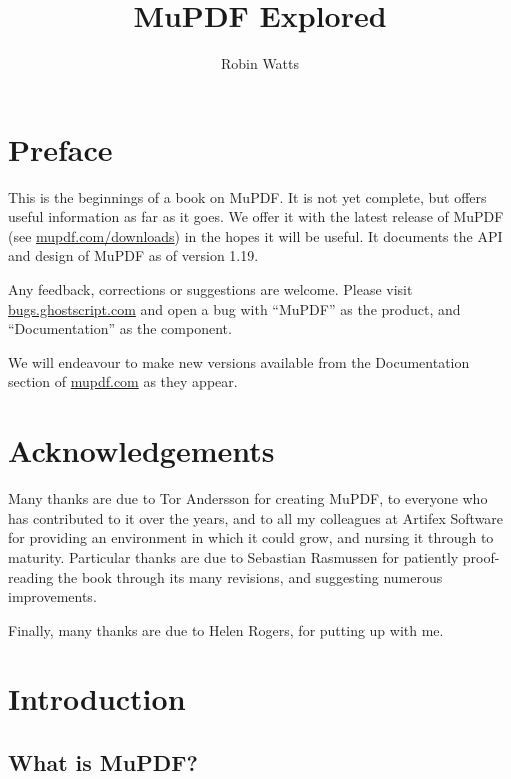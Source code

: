 \documentclass[oneside]{book}
\begin{document}
\title{MuPDF Explored}
\author{Robin Watts}

\maketitle

\frontmatter

\chapter{Preface}

This is the beginnings of a book on MuPDF. It is not yet complete, but offers useful information as far as it goes. We offer it with the latest release of MuPDF (see \url{mupdf.com/downloads}) in the hopes it will be useful. It documents the API and design of MuPDF as of version 1.19.

Any feedback, corrections or suggestions are welcome. Please visit \url{bugs.ghostscript.com} and open a bug with ``MuPDF'' as the product, and ``Documentation'' as the component.

We will endeavour to make new versions available from the Documentation section of \url{mupdf.com} as they appear.


\chapter{Acknowledgements}

Many thanks are due to Tor Andersson for creating MuPDF, to everyone who has contributed to it over the years, and to all my colleagues at Artifex Software for providing an environment in which it could grow, and nursing it through to maturity. Particular thanks are due to Sebastian Rasmussen for patiently proof-reading the book through its many revisions, and suggesting numerous improvements.

Finally, many thanks are due to Helen Rogers, for putting up with me.

\tableofcontents

\mainmatter

\chapter{Introduction}
\label{Introduction}


\section{What is MuPDF?}
\end{document}
